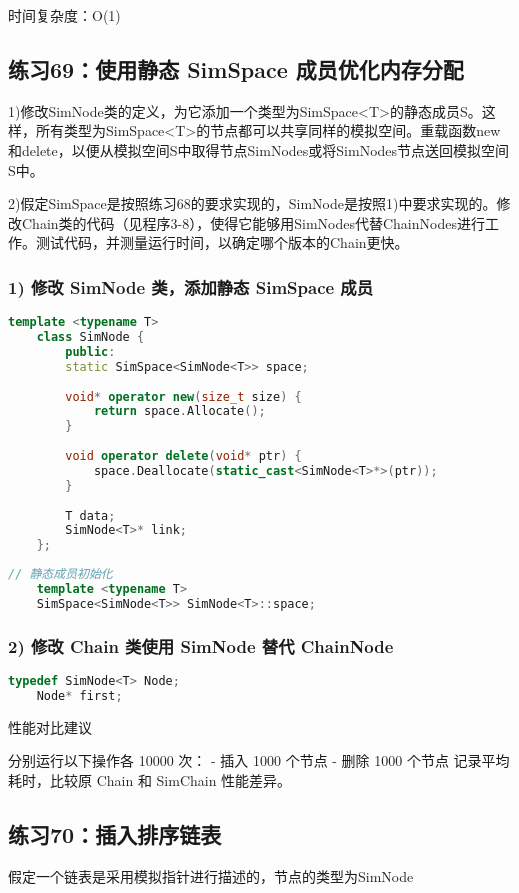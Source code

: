 \documentclass[UTF8]{ctexart}
\begin{document}
时间复杂度：O(1)


\subsection*{练习69：使用静态 SimSpace 成员优化内存分配}
1)修改SimNode类的定义，为它添加一个类型为SimSpace<T>的静态成员S。这样，所有类型为SimSpace<T>的节点都可以共享同样的模拟空间。重载函数new和delete，以便从模拟空间S中取得节点SimNodes或将SimNodes节点送回模拟空间S中。

2)假定SimSpace是按照练习68的要求实现的，SimNode是按照1)中要求实现的。修改Chain类的代码（见程序3-8），使得它能够用SimNodes代替ChainNodes进行工作。测试代码，并测量运行时间，以确定哪个版本的Chain更快。
\subsubsection*{1) 修改 SimNode 类，添加静态 SimSpace 成员}

\begin{lstlisting}[language=C++]
	template <typename T>
	class SimNode {
		public:
		static SimSpace<SimNode<T>> space;
		
		void* operator new(size_t size) {
			return space.Allocate();
		}
		
		void operator delete(void* ptr) {
			space.Deallocate(static_cast<SimNode<T>*>(ptr));
		}
		
		T data;
		SimNode<T>* link;
	};
\end{lstlisting}

\begin{lstlisting}[language=C++]
	// 静态成员初始化
	template <typename T>
	SimSpace<SimNode<T>> SimNode<T>::space;
\end{lstlisting}

\subsubsection*{2) 修改 Chain 类使用 SimNode 替代 ChainNode}

\begin{lstlisting}[language=C++]
	typedef SimNode<T> Node;
	Node* first;
\end{lstlisting}

性能对比建议

分别运行以下操作各 10000 次：
- 插入 1000 个节点
- 删除 1000 个节点
记录平均耗时，比较原 Chain 和 SimChain 性能差异。


\subsection*{练习70：插入排序链表}
假定一个链表是采用模拟指针进行描述的，节点的类型为SimNode
\end{document}
